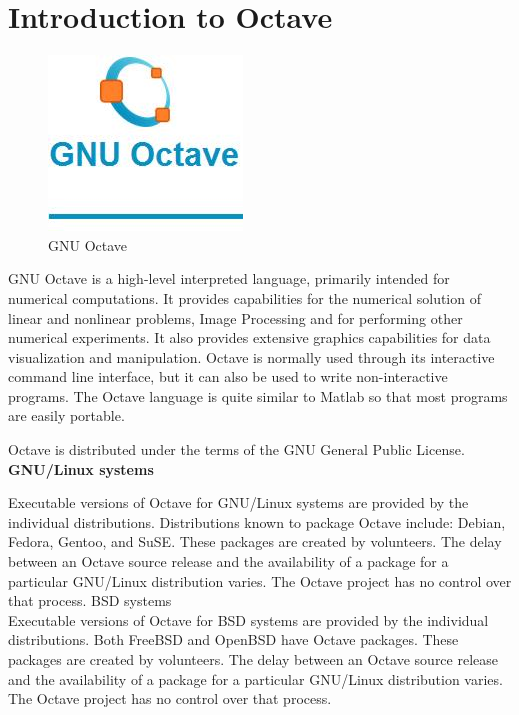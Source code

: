 
\section{ Introduction to Octave}
\begin{figure}[ht]
	\centering \includegraphics[scale=.50]{input/images/oc.jpg}
	\caption{GNU Octave}
\end{figure}

 GNU Octave is a high-level interpreted language, primarily intended for numerical computations. It provides capabilities for the numerical solution of linear and nonlinear problems, Image Processing and for performing other numerical experiments. It also provides extensive graphics capabilities for data visualization and manipulation. Octave is normally used through its interactive command line interface, but it can also be used to write non-interactive programs. The Octave language is quite similar to Matlab so that most programs are easily portable.

 Octave is distributed under the terms of the GNU General Public License.\\ 
 
 \textbf{GNU/Linux systems}
 
 Executable versions of Octave for GNU/Linux systems are provided by the individual distributions. Distributions known to package Octave include: Debian, Fedora, Gentoo, and SuSE. These packages are created by volunteers. The delay between an Octave source release and the availability of a package for a particular GNU/Linux distribution varies. The Octave project has no control over that process. 
 BSD systems\\
 
 Executable versions of Octave for BSD systems are provided by the individual distributions. Both FreeBSD and OpenBSD have Octave packages. These packages are created by volunteers. The delay between an Octave source release and the availability of a package for a particular GNU/Linux distribution varies. The Octave project has no control over that process.\\
 

